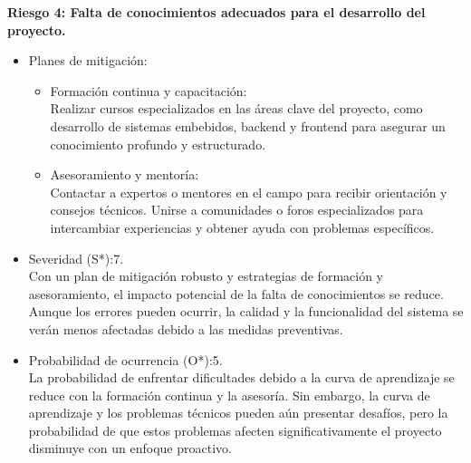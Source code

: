 \textbf{Riesgo 4: Falta de conocimientos adecuados para el desarrollo del
	proyecto.}
\begin{itemize}
	\item Planes de mitigación:\\
	      \begin{itemize}
		      \item Formación continua y capacitación:\\ Realizar cursos especializados en las
		            áreas clave del proyecto, como desarrollo de sistemas embebidos, backend y
		            frontend para asegurar un conocimiento profundo y estructurado.
		      \item Asesoramiento y mentoría:\\ Contactar a expertos o mentores en el campo para
		            recibir orientación y consejos técnicos. Unirse a comunidades o foros
		            especializados para intercambiar experiencias y obtener ayuda con problemas
		            específicos.
	      \end{itemize}
	\item Severidad (S*):7.\\ Con un plan de mitigación robusto y estrategias de
	      formación y asesoramiento, el impacto potencial de la falta de conocimientos se
	      reduce. Aunque los errores pueden ocurrir, la calidad y la funcionalidad del
	      sistema se verán menos afectadas debido a las medidas preventivas.
	\item Probabilidad de ocurrencia (O*):5.\\ La probabilidad de enfrentar dificultades
	      debido a la curva de aprendizaje se reduce con la formación continua y la
	      asesoría. Sin embargo, la curva de aprendizaje y los problemas técnicos pueden
	      aún presentar desafíos, pero la probabilidad de que estos problemas afecten
	      significativamente el proyecto disminuye con un enfoque proactivo.
\end{itemize}